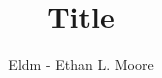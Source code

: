 \documentclass[12pt]{report}
\title{Title}
\author{Eldm - Ethan L. Moore}
\begin{document}
\maketitle
\begin{abstract}
		
\end{abstract}
\end{document}
